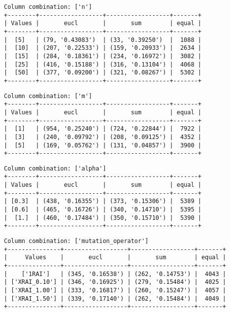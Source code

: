 \documentclass{article}
\begin{document}
\begin{verbatim}
Column combination: ['n']
+--------+------------------+------------------+-------+
| Values |       eucl       |       sum        | equal |
+--------+------------------+------------------+-------+
|  [5]   | (79, '0.43083')  | (33, '0.39250')  |  1088 |
|  [10]  | (207, '0.22533') | (159, '0.20933') |  2634 |
|  [15]  | (284, '0.18361') | (234, '0.16972') |  3082 |
|  [25]  | (416, '0.15188') | (316, '0.13104') |  4068 |
|  [50]  | (377, '0.09200') | (321, '0.08267') |  5302 |
+--------+------------------+------------------+-------+
\end{verbatim}

\begin{verbatim}
Column combination: ['m']
+--------+------------------+------------------+-------+
| Values |       eucl       |       sum        | equal |
+--------+------------------+------------------+-------+
|  [1]   | (954, '0.25240') | (724, '0.22844') |  7922 |
|  [3]   | (240, '0.09792') | (208, '0.09125') |  4352 |
|  [5]   | (169, '0.05762') | (131, '0.04857') |  3900 |
+--------+------------------+------------------+-------+
\end{verbatim}

\begin{verbatim}
Column combination: ['alpha']
+--------+------------------+------------------+-------+
| Values |       eucl       |       sum        | equal |
+--------+------------------+------------------+-------+
| [0.3]  | (438, '0.16355') | (373, '0.15306') |  5389 |
| [0.6]  | (465, '0.16726') | (340, '0.14710') |  5395 |
|  [1.]  | (460, '0.17484') | (350, '0.15710') |  5390 |
+--------+------------------+------------------+-------+
\end{verbatim}

\begin{verbatim}
Column combination: ['mutation_operator']
+---------------+------------------+------------------+-------+
|     Values    |       eucl       |       sum        | equal |
+---------------+------------------+------------------+-------+
|    ['1RAI']   | (345, '0.16538') | (262, '0.14753') |  4043 |
| ['XRAI_0.10'] | (346, '0.16925') | (279, '0.15484') |  4025 |
| ['XRAI_1.00'] | (333, '0.16817') | (260, '0.15247') |  4057 |
| ['XRAI_1.50'] | (339, '0.17140') | (262, '0.15484') |  4049 |
+---------------+------------------+------------------+-------+
\end{verbatim}
\end{document}

